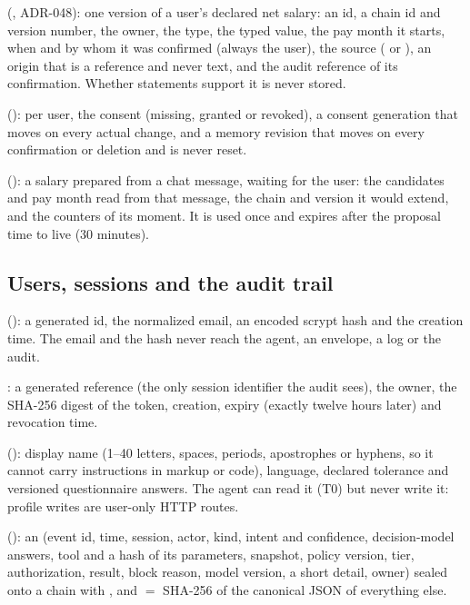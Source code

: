 \begin{description}[style=nextline,leftmargin=1.2em]
  \item[\code{Declaration}] (, ADR-048): one version of a user's declared net salary: an
    id, a chain id and version number, the owner, the type, the typed value, the pay month it starts, when and by whom it
    was confirmed (always the user), the source ( or ), an origin that is a reference and never
    text, and the audit reference of its confirmation. Whether statements support it is never stored.
  \item[\code{MemoryState}] (): per user, the consent (missing, granted or revoked), a
    consent generation that moves on every actual change, and a memory revision that moves on every confirmation or
    deletion and is never reset.
  \item[\code{MemoryProposal}] (): a salary prepared from a chat message, waiting for the
    user: the candidates and pay month read from that message, the chain and version it would extend, and the counters
    of its moment. It is used once and expires after the proposal time to live (30 minutes).
\end{description}

\subsection{Users, sessions and the audit trail}

\begin{description}[style=nextline,leftmargin=1.2em]
  \item[\code{UserAccount}] (): a generated  id, the normalized email, an encoded
    scrypt hash and the creation time. The email and the hash never reach the agent, an envelope, a log or the audit.
  \item[\code{Session}]: a generated  reference (the only session identifier the audit sees), the owner,
    the SHA-256 digest of the token, creation, expiry (exactly twelve hours later) and revocation time.
  \item[\code{UserProfile}] (): display name (1--40 letters, spaces, periods, apostrophes or
    hyphens, so it cannot carry instructions in markup or code), language, declared tolerance and versioned
    questionnaire answers. The agent can read it (T0) but never write it: profile writes are user-only HTTP routes.
  \item[\code{AuditEvent}] (): an  (event id, time, session, actor, kind,
    intent and confidence, decision-model answers, tool and a hash of its parameters, snapshot, policy version, tier,
    authorization, result, block reason, model version, a short detail, owner) sealed onto a chain with
    ,  and  $=$ SHA-256 of the canonical JSON of everything else.
\end{description}

